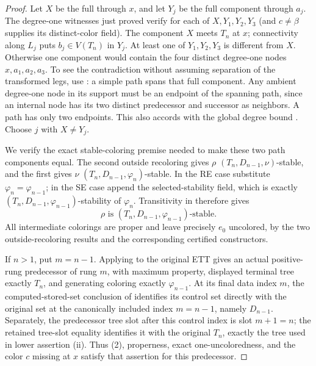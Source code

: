 \begin{proof}
Let $X$ be the full  through $x$, and let
$Y_j$ be the full component through $a_j$.  The degree-one witnesses
just proved verify  for each of
$X,Y_1,Y_2,Y_3$ (and $c\ne\beta$ supplies its distinct-color field).
The component $X$ meets $T_n$ at $x$; connectivity along $L_j$ puts
$b_j\in V(T_n)$ in $Y_j$.  At least one of $Y_1,Y_2,Y_3$ is different
from $X$.  Otherwise one component would contain the four distinct
degree-one nodes $x,a_1,a_2,a_3$.  To see the contradiction without
assuming separation of the transformed legs, use
: a simple path spans that full
component.  Any ambient degree-one node in its support must be an
endpoint of the spanning path, since an internal node has its two
distinct predecessor and successor as neighbors.  A path has only two
endpoints.  This also accords with the global degree bound
.  Choose $j$ with $X\ne Y_j$.

We verify the exact stable-coloring premise needed to make these two path
components equal.  The second outside recoloring gives $\rho$
$(T_n,D_{n-1},\nu)$-stable, and the first gives $\nu$
$(T_n,D_{n-1},\varphi_n)$-stable.  In the RE case substitute
$\varphi_n=\varphi_{n-1}$; in the SE case append the selected-stability
field, which is exactly
$(T_n,D_{n-1},\varphi_{n-1})$-stability of $\varphi_n$.
Transitivity in  therefore gives
\[
        \rho\text{ is }(T_n,D_{n-1},\varphi_{n-1})\text{-stable}.
        \tag{2}
\]
All intermediate colorings are proper and leave precisely $e_0$
uncolored, by the two outside-recoloring results and the corresponding
certified constructors.

If $n>1$, put $m=n-1$.  Applying
 to the original ETT gives an actual
positive-rung predecessor of rung $m$, with maximum property, displayed
terminal tree exactly $T_n$, and generating coloring exactly
$\varphi_{n-1}$.  At its final data index $m$, the computed-stored-set
conclusion of  identifies its control
set directly with the original set at the canonically included index
$m=n-1$, namely $D_{n-1}$.  Separately, the predecessor tree slot after
this control index is slot $m+1=n$; the retained tree-slot equality
identifies it with the original $T_n$, exactly the tree used in lower
assertion (ii).  Thus (2), properness, exact one-uncoloredness, and
the color $c$ missing at $x$ satisfy that assertion for this predecessor.


\end{proof}
